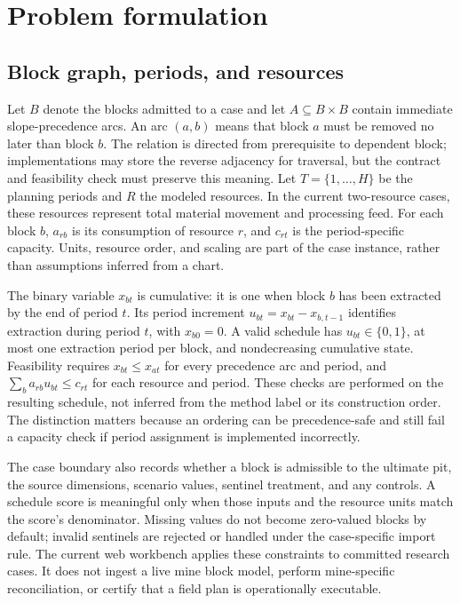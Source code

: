 \section{Problem formulation}
\label{sec:decision-model}
\subsection{Block graph, periods, and resources}
Let $B$ denote the blocks admitted to a case and let $A\subseteq B\times B$ contain immediate slope-precedence arcs. An arc $(a,b)$ means that block $a$ must be removed no later than block $b$. The relation is directed from prerequisite to dependent block; implementations may store the reverse adjacency for traversal, but the contract and feasibility check must preserve this meaning. Let $T=\{1,\ldots,H\}$ be the planning periods and $R$ the modeled resources. In the current two-resource cases, these resources represent total material movement and processing feed. For each block $b$, $a_{rb}$ is its consumption of resource $r$, and $c_{rt}$ is the period-specific capacity. Units, resource order, and scaling are part of the case instance, rather than assumptions inferred from a chart.

The binary variable $x_{bt}$ is cumulative: it is one when block $b$ has been extracted by the end of period $t$. Its period increment $u_{bt}=x_{bt}-x_{b,t-1}$ identifies extraction during period $t$, with $x_{b0}=0$. A valid schedule has $u_{bt}\in\{0,1\}$, at most one extraction period per block, and nondecreasing cumulative state. Feasibility requires $x_{bt}\leq x_{at}$ for every precedence arc and period, and $\sum_b a_{rb}u_{bt}\leq c_{rt}$ for each resource and period. These checks are performed on the resulting schedule, not inferred from the method label or its construction order. The distinction matters because an ordering can be precedence-safe and still fail a capacity check if period assignment is implemented incorrectly.

The case boundary also records whether a block is admissible to the ultimate pit, the source dimensions, scenario values, sentinel treatment, and any controls. A schedule score is meaningful only when those inputs and the resource units match the score's denominator. Missing values do not become zero-valued blocks by default; invalid sentinels are rejected or handled under the case-specific import rule. The current web workbench applies these constraints to committed research cases. It does not ingest a live mine block model, perform mine-specific reconciliation, or certify that a field plan is operationally executable.

